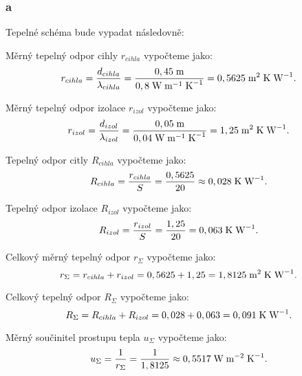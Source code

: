 \documentclass{article}
\begin{document}
\subsubsection{a}
Tepelné schéma bude vypadat následovně:

\begin{center}
\end{center}

Měrný tepelný odpor cihly $r_{cihla}$ vypočteme jako:
$$
    r_{cihla} = \frac{d_{cihla}}{\lambda_{cihla}} = \frac{0,45 \; \textrm{m}}{0,8 \; \textrm{W} \; \textrm{m}^{-1} \; \textrm{K}^{-1}} = 0,5625 \; \textrm{m}^{\textrm{2}} \; \textrm{K} \; \textrm{W}^{-1}.
$$

Měrný tepelný odpor izolace $r_{izol}$ vypočteme jako:
$$
    r_{izol} = \frac{d_{izol}}{\lambda_{izol}} = \frac{0,05 \; \textrm{m}}{0,04 \; \textrm{W} \; \textrm{m}^{-1} \; \textrm{K}^{-1}} = 1,25 \; \textrm{m}^{\textrm{2}} \; \textrm{K} \; \textrm{W}^{-1}.
$$

Tepelný odpor citly $R_{cihla}$ vypočteme jako:
$$
    R_{cihla} = \frac{r_{cihla}}{S} = \frac{0,5625}{20} \approx 0,028 \; \textrm{K} \; \textrm{W}^{-1}.
$$

Tepelný odpor izolace $R_{izol}$ vypočteme jako:
$$
    R_{izol} = \frac{r_{izol}}{S} = \frac{1,25}{20} = 0,063 \; \textrm{K} \; \textrm{W}^{-1}.
$$

Celkový měrný tepelný odpor $r_{\Sigma}$ vypočteme jako:
$$
    r_{\Sigma} = r_{cihla} + r_{izol} = 0,5625 + 1,25 = 1,8125 \; \textrm{m}^{\textrm{2}} \; \textrm{K} \; \textrm{W}^{-1}.
$$

Celkový tepelný odpor $R_{\Sigma}$ vypočteme jako:
$$
    R_{\Sigma} = R_{cihla} + R_{izol} = 0,028 + 0,063 = 0,091 \; \textrm{K} \; \textrm{W}^{-1}.
$$

Měrný součinitel prostupu tepla $u_{\Sigma}$ vypočteme jako:
$$
    u_{\Sigma} = \frac{1}{r_{\Sigma}} = \frac{1}{1,8125} \approx 0,5517 \; \textrm{W} \; \textrm{m}^{-2} \; \textrm{K}^{-1}.
$$
\end{document}
